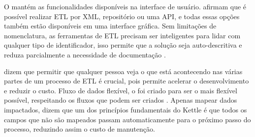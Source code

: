 O \pdi mantém as funcionalidades disponíveis na interface de usuário.  afirmam que é possível realizar ETL por XML, repositório ou uma API, e todas essas opções também estão disponíveis em uma interface gráfica. Sem limitações de nomenclatura, as ferramentas de ETL precisam ser inteligentes para lidar com qualquer tipo de identificador, isso permite que a solução seja auto-descritiva e reduza parcialmente a necessidade de documentação \citep{kettle}.

 dizem que permitir que qualquer pessoa veja o que está acontecendo nas várias partes de um processo de ETL é crucial, pois permite acelerar o desenvolvimento e reduzir o custo. Fluxo de dados flexível, o \pdi foi criado para ser o mais flexível possível, respeitando os fluxos que podem ser criados \citep{kettle}. Apenas mapear dados impactados,  dizem que um dos princípios fundamentais do Kettle é que todos os campos que não são mapeados passam automaticamente para o próximo passo do processo, reduzindo assim o custo de manutenção.

